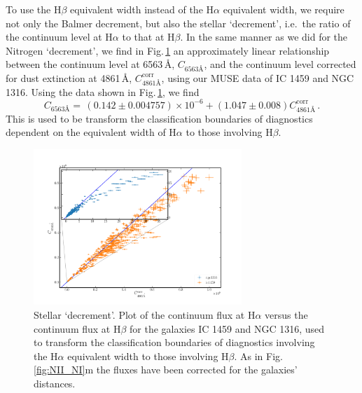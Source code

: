 
		To use the H$\beta$ equivalent width instead of the H$\alpha$ equivalent width, we require not only the Balmer decrement, but also the stellar `decrement', i.e.\ the ratio of the continuum level at H$\alpha$ to that at H$\beta$. In the same manner as we did for the Nitrogen `decrement', we find in Fig.\,\ref{fig:stellarDec} an approximately linear relationship between the continuum level at 6563\,\AA, $C_\text{6563\AA}$, and the continuum level corrected for dust extinction at 4861\,\AA, $C^\text{corr}_\text{4861\AA}$, using our MUSE data of IC 1459 and NGC 1316. Using the data shown in Fig.\,\ref{fig:stellarDec}, we find
		\begin{equation}
			C_\text{6563\AA} = \,  (0.142\pm0.004757) \times 10^{-6} + (1.047\pm0.008) C^\text{corr}_\text{4861\AA} \, .
		\end{equation}
		This is used to be transform the classification boundaries of diagnostics dependent on the equivalent width of H$\alpha$ to those involving H$\beta$. 

		\begin{figure}
			\centering
			\includegraphics[width=0.7\textwidth]{chapter5/stellar_ratio.png}
			\caption[The stellar `decrement']{Stellar `decrement'. Plot of the continuum flux at H$\alpha$ versus the continuum flux at H$\beta$ for the galaxies IC 1459 and NGC 1316, used to transform the classification boundaries of diagnostics involving the H$\alpha$ equivalent width to those involving H$\beta$. As in Fig.\,\ref{fig:NII_NI}m the fluxes have been corrected for the galaxies' distances.} 
			\label{fig:stellarDec}
		\end{figure}


